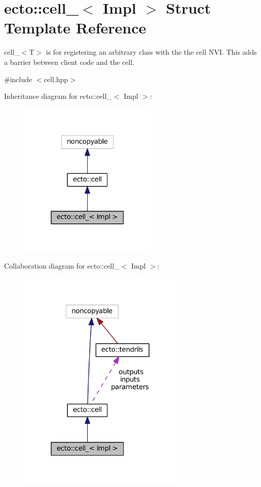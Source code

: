 \hypertarget{structecto_1_1cell__}{}\section{ecto\+:\+:cell\+\_\+$<$ Impl $>$ Struct Template Reference}
\label{structecto_1_1cell__}


cell\+\_\+$<$\+T$>$ is for registering an arbitrary class with the the cell N\+VI. This adds a barrier between client code and the cell.  




{\ttfamily \#include $<$cell.\+hpp$>$}



Inheritance diagram for ecto\+:\+:cell\+\_\+$<$ Impl $>$\+:\nopagebreak
\begin{figure}[H]
\begin{center}
\leavevmode
\includegraphics[width=187pt]{structecto_1_1cell____inherit__graph}
\end{center}
\end{figure}


Collaboration diagram for ecto\+:\+:cell\+\_\+$<$ Impl $>$\+:\nopagebreak
\begin{figure}[H]
\begin{center}
\leavevmode
\includegraphics[width=226pt]{structecto_1_1cell____coll__graph}
\end{center}
\end{figure}

